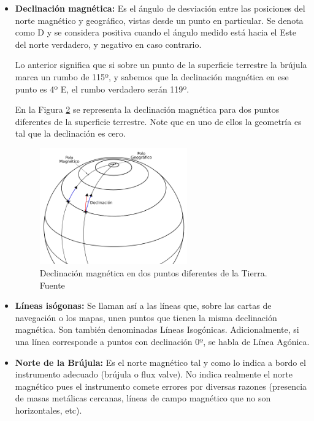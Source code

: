\begin{itemize}
\begin{figure}[!htb]
  \label{fig:06.movimiento.polos.magneticos}
\end{figure}

\item \textbf{Declinación magnética:} Es el ángulo de desviación entre las posiciones del norte magnético y geográfico, vistas desde un punto en particular. Se denota como D y se considera positiva cuando el ángulo medido está hacia el Este del norte verdadero, y negativo en caso contrario. 

Lo anterior significa que si sobre un punto de la superficie terrestre la brújula marca un rumbo de 115º, y sabemos que la declinación magnética en ese punto es 4º E, el rumbo verdadero serán 119º. 

En la Figura \ref{fig:declinacion-magnetica} se representa la declinación magnética para dos puntos diferentes de la superficie terrestre. Note que en uno de ellos la geometría es tal que la declinación es cero. 

\begin{figure}[!h]
    \centering
\includegraphics[keepaspectratio,width=0.6\textwidth]{06.radionavegacion/Imagenes/declinacion-magnetica.png}
\caption{Declinaci\'on magn\'etica en dos puntos diferentes de la Tierra. Fuente  \protect\cite{Salazar_nav_aerea}}
\label{fig:declinacion-magnetica}
\end{figure}

\item \textbf{Líneas isógonas:} Se llaman así a las líneas que, sobre las cartas de navegación o los mapas, unen puntos que tienen la misma declinación magnética. Son también denominadas Líneas Isogónicas. Adicionalmente, si una línea corresponde a puntos con declinación 0º, se habla de Línea Agónica. 

\item \textbf{Norte de la Brújula:} Es el norte magnético tal y como lo indica a bordo el instrumento adecuado (brújula o flux valve). No indica realmente el norte magnético pues el instrumento comete errores por diversas razones (presencia de masas metálicas cercanas, líneas de campo magnético que no son horizontales, etc).


\end{itemize}
